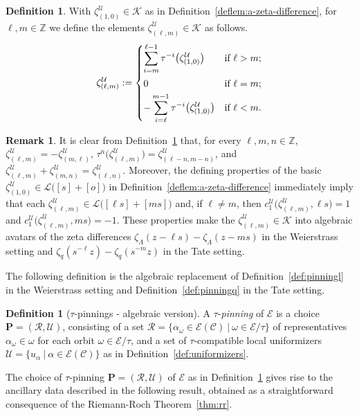 \documentclass[preprint,12pt]{elsarticle}
\numberwithin{equation}{section} %
\theoremstyle{theorem}
\theoremstyle{definition}
\newtheorem{definition}[theorem]{Definition}
\newtheorem{remark}[theorem]{Remark}
\newcommand{\Cq}{\mathcal{C}} %
\newcommand{\Ca}{\mathcal{C}} %
\newcommand{\bk}{\mathcal{K}} %
\newcommand{\ec}{\mathcal{E}} %
\newcommand{\idec}{{o}} %
\newcommand{\orbita}{{\ec/\tau}} %
\newcommand{\Z}{\mathbb{Z}} %
\newcommand{\zl}{\zeta_{\Lambda}}
\newcommand{\zq}{\zeta_{q}}
\newcommand{\za}[2]{\zeta^{\mathcal{U}}_{( {#1} , {#2} )}}
\begin{document}
\begin{definition}\label{def:a-zeta-differences}
    With $\za{1}{0}\in\bk$ as in Definition~\ref{deflem:a-zeta-difference}, for $\ell,m\in\Z$ we define the elements $\za{\ell}{m}\in\bk$ as follows.
    \[\za{\ell}{m}:=\begin{cases}
        \displaystyle \sum_{i=m}^{\ell-1} \tau^{-i}\bigl(\za{1}{0}\bigr) & \text{if} \ \ell > m; \\
        0 \vphantom{\dfrac{A}{A}}& \text{if} \ \ell=m;\\
        \displaystyle -\sum_{i=\ell}^{m-1} \tau^{-i}\bigl(\za{1}{0}\bigr) & \text{if} \ \ell<m.     
    \end{cases}\]
\end{definition}

\begin{remark}\label{rem:a-zeta-differences} It is clear from Definition~\ref{def:a-zeta-differences} that, for every $\ell,m,n\in\Z$, $\za{\ell}{m}=-\za{m}{\ell}$, $\tau^n\bigl(\za{\ell}{m}\bigr)=\za{\ell-n}{m-n}$, and $\za{\ell}{m}+\za{m}{n}=\za{\ell}{n}$. Moreover, the defining properties of the basic $\za{1}{0}\in\mathcal{L}\bigl([s]+[\idec]\bigr)$ in Definition~\ref{deflem:a-zeta-difference} immediately imply that each $\za{\ell}{m}\in\mathcal{L}\bigl([\ell s]+[ms]\bigr)$ and, if $\ell\neq m$, then $c_1^\mathcal{U}\bigl(\za{\ell}{m},\ell s\bigr)=1$ and $c_1^\mathcal{U}\bigl(\za{\ell}{m},m s\bigr)=-1$. These properties make the $\za{\ell}{m}\in\bk$ into algebraic avatars of the zeta differences $\zl(z-\ell s)-\zl(z-ms)$ in the Weierstrass setting and $\zq(s^{-\ell}z)-\zq(s^{-m}z)$ in the Tate setting.
\end{remark}

The following definition is the algebraic replacement of Definition~\ref{def:pinningl} in the Weierstrass setting and Definition~\ref{def:pinningq} in the Tate setting.

\begin{definition}[$\tau$-pinnings - algebraic version]\label{def:pinninga}
    A $\tau$-\emph{pinning} of $\ec$ is a choice $\mathbf{P}=(\mathcal{R},\mathcal{U})$, consisting of a set $\mathcal{R}=\{\alpha_\omega\in\ec(\Cq) \ | \ \omega\in\orbita\}$ of representatives $\alpha_\omega\in\omega$ for each orbit $\omega\in\orbita$, and a set of $\tau$-compatible local uniformizers $\mathcal{U}=\{u_\alpha \ | \ \alpha\in\ec(\Ca)\}$ as in Definition~\ref{def:uniformizers}.
\end{definition}

The choice of $\tau$-pinning $\mathbf{P}=(\mathcal{R},\mathcal{U})$ of $\ec$ as in Definition~\ref{def:pinninga} gives rise to the ancillary data described in the following result, obtained as a straightforward consequence of the Riemann-Roch Theorem~\ref{thm:rr}.
\end{document}
